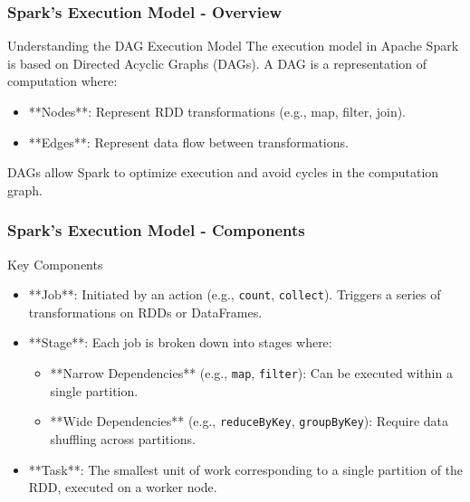 \documentclass[aspectratio=169]{beamer}
\begin{document}
\begin{frame}[fragile]
    \frametitle{Spark's Execution Model - Overview}
    \begin{block}{Understanding the DAG Execution Model}
        The execution model in Apache Spark is based on Directed Acyclic Graphs (DAGs). A DAG is a representation of computation where:
        \begin{itemize}
            \item **Nodes**: Represent RDD transformations (e.g., map, filter, join).
            \item **Edges**: Represent data flow between transformations.
        \end{itemize}
        DAGs allow Spark to optimize execution and avoid cycles in the computation graph.
    \end{block}
\end{frame}

\begin{frame}[fragile]
    \frametitle{Spark's Execution Model - Components}
    \begin{block}{Key Components}
        \begin{itemize}
            \item **Job**: Initiated by an action (e.g., \texttt{count}, \texttt{collect}). Triggers a series of transformations on RDDs or DataFrames.
            \item **Stage**: Each job is broken down into stages where:
            \begin{itemize}
                \item **Narrow Dependencies** (e.g., \texttt{map}, \texttt{filter}): Can be executed within a single partition.
                \item **Wide Dependencies** (e.g., \texttt{reduceByKey}, \texttt{groupByKey}): Require data shuffling across partitions.
            \end{itemize}
            \item **Task**: The smallest unit of work corresponding to a single partition of the RDD, executed on a worker node.
        \end{itemize}
    \end{block}
\end{frame}
\end{document}
